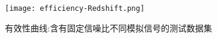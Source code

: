 \begin{figure}[!htbp]
\centering
\texttt{[image: efficiency-Redshift.png]}
\caption{\label{fig:EC-SNR}有效性曲线:含有固定信噪比不同模拟信号的测试数据集}
\end{figure}



